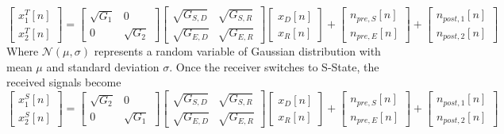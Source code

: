 \begin{equation}
\begin{bmatrix}x^T_1[n] \\ x^T_2[n] \end{bmatrix} = 
\begin{bmatrix}\sqrt{G_1} & 0 \\ 0 & \sqrt{G_2} \end{bmatrix} 
\begin{bmatrix}\sqrt{G_{S,D}} & \sqrt{G_{S,R}}  \\ \sqrt{G_{E,D}} & \sqrt{G_{E,R}} \end{bmatrix} 
\begin{bmatrix}x_D[n] \\ x_R[n] \end{bmatrix} +
\begin{bmatrix} n_{pre,S}[n] \\ n_{pre,E}[n] \end{bmatrix} + 
\begin{bmatrix} n_{post,1}[n] \\ n_{post,2}[n] \end{bmatrix} 
\end{equation}
Where $\mathcal{N}(\mu, \sigma)$ represents a random variable of Gaussian distribution with mean $\mu$ and standard deviation $\sigma$. Once the receiver switches to S-State, the received signals become
\begin{equation}
\begin{bmatrix}x^S_1[n] \\ x^S_2[n] \end{bmatrix} = 
\begin{bmatrix}\sqrt{G_2} & 0 \\ 0 & \sqrt{G_1} \end{bmatrix} 
\begin{bmatrix}\sqrt{G_{S,D}} & \sqrt{G_{S,R}}  \\ \sqrt{G_{E,D}} & \sqrt{G_{E,R}} \end{bmatrix} 
\begin{bmatrix}x_D[n] \\ x_R[n] \end{bmatrix} +
\begin{bmatrix} n_{pre,S}[n] \\ n_{pre,E}[n] \end{bmatrix} + 
\begin{bmatrix} n_{post,1}[n] \\ n_{post,2}[n] \end{bmatrix} 
\end{equation}
